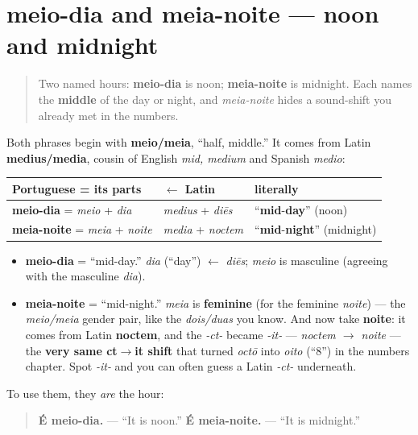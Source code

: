 \section[meio-dia, meia-noite]{meio-dia and meia-noite — noon and midnight}

\label{lesson:PT-C08-meio-dia-meia-noite}



\begin{quote}
Two named hours: \textbf{meio-dia} is noon; \textbf{meia-noite} is midnight. Each names the \textbf{middle} of the day or night, and \emph{meia-noite} hides a sound-shift you already met in the numbers.
\end{quote}

\begin{cousinweb}
Both phrases begin with \textbf{meio/meia}, “half, middle.” It comes from Latin \textbf{medius/media}, cousin of English \emph{mid, medium} and Spanish \emph{medio}:

\noindent
\begin{tabularx}{\linewidth}{@{}>{\raggedright\arraybackslash}X>{\raggedright\arraybackslash}X>{\raggedright\arraybackslash}X@{}}
\toprule
\textbf{Portuguese = its parts} & \textbf{$\leftarrow$ Latin} & \textbf{literally} \\
\midrule
\textbf{meio-dia} = \emph{meio} + \emph{dia} & \emph{medius} + \emph{diēs} & \textquotedblleft{}\textbf{mid}-\textbf{day}\textquotedblright{} (noon) \\
\textbf{meia-noite} = \emph{meia} + \emph{noite} & \emph{media} + \emph{noctem} & \textquotedblleft{}\textbf{mid}-\textbf{night}\textquotedblright{} (midnight) \\
\bottomrule
\end{tabularx}

\begin{itemize}
\raggedright
  \item \textbf{meio-dia} = \textquotedblleft{}mid-day.\textquotedblright{} \emph{dia} (\textquotedblleft{}day\textquotedblright{}) $\leftarrow$ \emph{diēs}; \emph{meio} is masculine (agreeing with the masculine \emph{dia}).
  \item \textbf{meia-noite} = \textquotedblleft{}mid-night.\textquotedblright{} \emph{meia} is \textbf{feminine} (for the feminine \emph{noite}) — the \emph{meio/meia} gender pair, like the \emph{dois/duas} you know. And now take \textbf{noite}: it comes from Latin \textbf{noctem}, and the \emph{-ct-} became \emph{-it-} — \emph{noctem $\to$ noite} — the \textbf{very same ct$\to$it shift} that turned \emph{octō} into \emph{oito} (\textquotedblleft{}8\textquotedblright{}) in the numbers chapter. Spot \emph{-it-} and you can often guess a Latin \emph{-ct-} underneath.
\end{itemize}

To use them, they \emph{are} the hour:

\begin{quote}
\textbf{É meio-dia.} — \textquotedblleft{}It is noon.\textquotedblright{} \textbf{É meia-noite.} — \textquotedblleft{}It is midnight.\textquotedblright{}
\end{quote}
\end{cousinweb}

